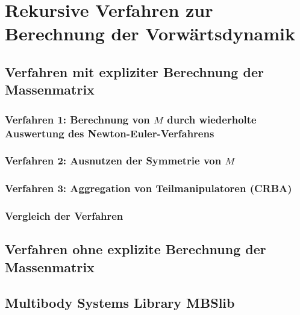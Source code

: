 	\section{Rekursive Verfahren zur Berechnung der Vorwärtsdynamik} %

		\subsection{Verfahren mit expliziter Berechnung der Massenmatrix} %

			\subsubsection{Verfahren 1: Berechnung von \(M\) durch wiederholte Auswertung des Newton-Euler-Verfahrens} %

			\subsubsection{Verfahren 2: Ausnutzen der Symmetrie von \(M\)} %

			\subsubsection{Verfahren 3: Aggregation von Teilmanipulatoren (CRBA)} %

			\subsubsection{Vergleich der Verfahren} %

		\subsection{Verfahren ohne explizite Berechnung der Massenmatrix} %

		\subsection{Multibody Systems Library MBSlib} %

